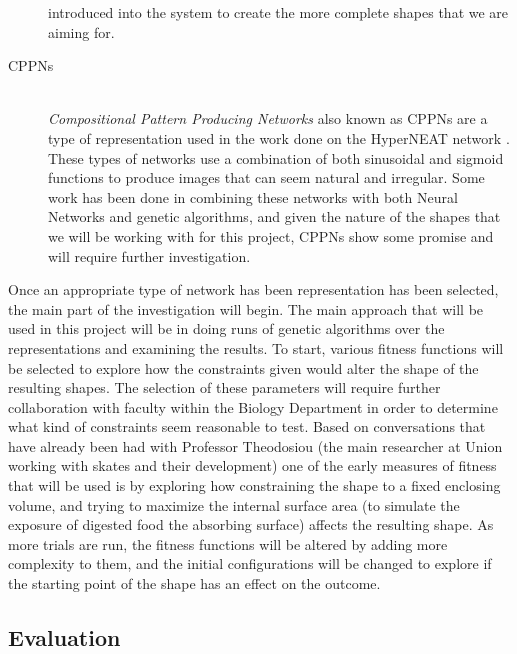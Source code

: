 \documentclass[condensed]{union-cs-thesis}
\begin{document}
\begin{description}
introduced into the system to create the more complete shapes that we are aiming for.
\item[CPPNs] \cite{clune2010investigating} \\
\emph{Compositional Pattern Producing Networks} also known as CPPNs are a type of representation used in the work done on the
HyperNEAT network \cite{clune2010investigating}.  These types of networks use a combination of both sinusoidal and 
sigmoid functions to produce images that can seem natural and irregular.  Some work has been done in combining these networks
with both Neural Networks and genetic algorithms, and given the nature of the shapes that we will be working with for
this project, CPPNs show some promise and will require further investigation.
\end{description}

\par
Once an appropriate type of network has been representation has been selected, the main part of the investigation
will begin.  The main approach that will be used in this project will be in doing runs of genetic algorithms over
the representations and examining the results.  To start, various fitness functions will be selected to explore
how the constraints given would alter the shape of the resulting shapes.  The selection of these parameters will
require further collaboration with faculty within the Biology Department in order to determine what kind of 
constraints seem reasonable to test.  Based on conversations that have already been had with Professor Theodosiou
(the main researcher at Union working with skates and their development) one of the early measures of fitness
that will be used is by exploring how constraining the shape to a fixed enclosing volume, and trying to maximize
the internal surface area (to simulate the exposure of digested food the absorbing surface) affects the resulting shape.
As more trials are run, the fitness functions will be altered by adding more complexity to them, and the initial
configurations will be changed to explore if the starting point of the shape has an effect on the outcome.

\subsection{Evaluation}
\end{document}
